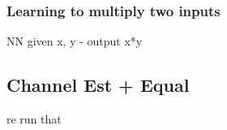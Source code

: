\subsubsection{Learning to multiply two inputs}
NN given x, y - output x*y

\subsection{Channel Est + Equal}
re run that 